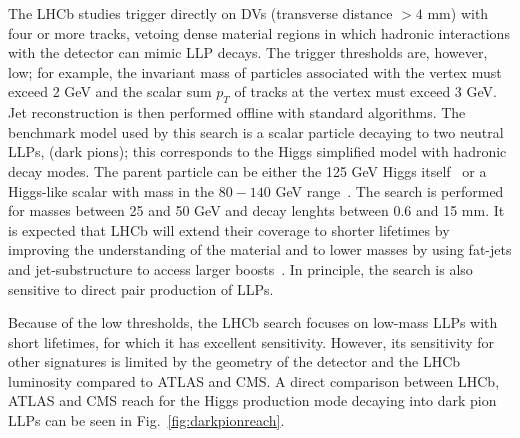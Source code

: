 The LHCb studies \cite{Aaij:2016isa,Aaij:2017mic} trigger directly on DVs (transverse distance $> 4$ mm) with four or more tracks, vetoing dense material regions in which hadronic interactions with the detector can mimic LLP decays. The trigger thresholds are, however, low; for example, the invariant mass of particles associated with the vertex must exceed 2 GeV and the scalar sum $p_T$ of tracks at the vertex must exceed 3 GeV.  Jet reconstruction is then performed offline with standard algorithms.   The  benchmark model used by this search is a scalar particle decaying to two neutral LLPs, \piv (dark pions); this corresponds to the Higgs simplified model with hadronic decay modes.  The parent particle can be either the 125 GeV Higgs itself~\cite{Aaij:2017mic} or a Higgs-like scalar with mass in the $80 - 140$ GeV range~\cite{Aaij:2016isa}.  The search is performed for \piv masses between 25 and 50 GeV and decay lenghts between 0.6 and 15 mm. It is expected that LHCb will extend their coverage to shorter lifetimes by improving the understanding of the material and to lower masses by using fat-jets and jet-substructure to access larger boosts~\cite{Vaszquez:2017workshop}. In principle, the search is also sensitive to direct pair production of LLPs. 

Because of the low thresholds, the LHCb search focuses on low-mass LLPs with short lifetimes, for which it has excellent sensitivity.  However, its sensitivity for other signatures is limited by the geometry of the detector and the LHCb luminosity compared to ATLAS and CMS. A direct comparison between LHCb, ATLAS and CMS reach for the Higgs production mode decaying into dark pion LLPs can be seen in Fig.~\ref{fig:darkpionreach}. 

